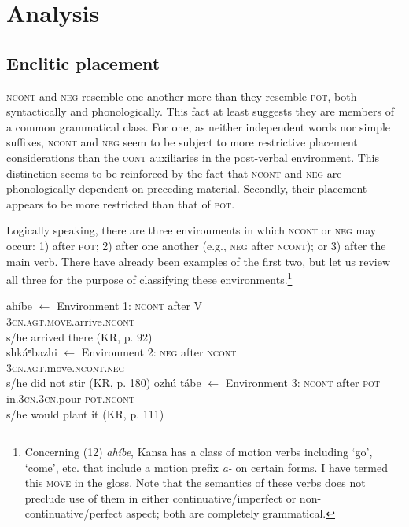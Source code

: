 \documentclass[output=paper]{LSP/langsci}
\begin{document}
\section{Analysis}
\subsection{Enclitic placement}
\textsc{ncont} and \textsc{neg} resemble one another more than they resemble \textsc{pot}, both syntactically and phonologically. This fact at least suggests they are members of a common grammatical class. For one, as neither independent words nor simple suffixes, \textsc{ncont} and \textsc{neg} seem to be subject to more restrictive placement considerations than the \textsc{cont} auxiliaries in the post-verbal environment. This distinction seems to be reinforced by the fact that \textsc{ncont} and \textsc{neg} are phonologically dependent on preceding material. Secondly, their placement appears to be more restricted than that of \textsc{pot}.

Logically speaking, there are three environments in which \textsc{ncont} or \textsc{neg} may occur: 1) after \textsc{pot}; 2) after one another (e.g., \textsc{neg} after \textsc{ncont}); or 3) after the main verb. There have already been examples of the first two, but let us review all three for the purpose of classifying these environments.\footnote{Concerning (12) \textit{ah\'ibe}, Kansa has a class of motion verbs including `go', `come', etc. that include a motion prefix \textit{a-} on certain forms. I have termed this \textsc{move} in the gloss. Note that the semantics of these verbs does not preclude use of them in either continuative/imperfect or non-continuative/perfect aspect; both are completely grammatical.}

\ea
\ea 
\glll
ah\'ibe  $\leftarrow$ Environment 1: \textsc{ncont} after V \\
\textsc{3cn.agt.move}.arrive.\textsc{ncont}  \\
\glt s/he arrived there (KR, p. 92)   \\
\ex 
shk\'aⁿbazhi   $\leftarrow$ Environment 2: \textsc{neg} after \textsc{ncont} \\
\textsc{3cn.agt}.move.\textsc{ncont.neg}   \\
\glt s/he did not stir (KR, p. 180)    
\ex
\glll
ozh\'u	t\'abe	 $\leftarrow$ Environment 3: \textsc{ncont} after \textsc{pot} \\
in.\textsc{3cn.3cn}.pour \textsc{pot.ncont}  \\
\glt s/he would plant it (KR, p. 111)    
\z 
\z 
\end{document}
